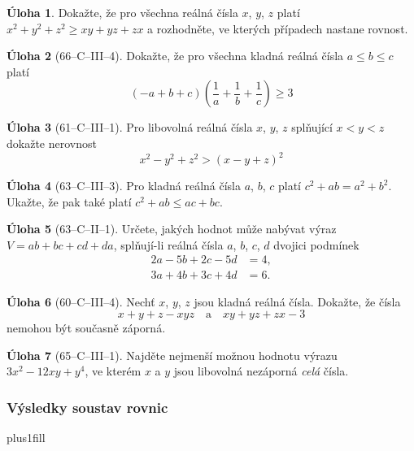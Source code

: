\documentclass[10pt,a5paper]{article}
\theoremstyle{definition}
\newtheorem{uloha}{\atr Úloha}
\def\vysld{}
\let\printvysl\relax
\def\atr{}
\let\results\newpage
\let\endresults\relax
\begin{document}
\begin{uloha}
Dokažte, že pro všechna reálná čísla $x$, $y$, $z$ platí $x^2 + y^2 + z^2 \geq xy + yz + zx$ a rozhodněte, ve kterých případech nastane rovnost.
\end{uloha}

\begin{uloha}[66--C--III--4]
Dokažte, že pro všechna kladná reálná čísla $a \leq b \leq c$ platí
\[ (-a+b+c)\left( \frac1a + \frac1b + \frac1c \right) \geq 3 \]
\end{uloha}

\begin{uloha}[61--C--III--1]
Pro libovolná reálná čísla $x$, $y$, $z$ splňující $x<y<z$ dokažte nerovnost
\[ x^2 - y^2 + z^2 > (x-y+z)^2 \]
\end{uloha}

\begin{uloha}[63--C--III--3]
Pro kladná reálná čísla $a$, $b$, $c$ platí $c^2 + ab = a^2 + b^2$. Ukažte, že pak také platí $c^2 + ab \leq ac + bc$.
\end{uloha}

\begin{uloha}[63--C--II--1]
Určete, jakých hodnot může nabývat výraz $V = ab + bc + cd + da$, splňují-li reálná čísla $a$, $b$, $c$, $d$ dvojici podmínek
\begin{align*}
2a - 5b + 2c - 5d &= 4,\\
3a + 4b + 3c + 4d &= 6.
\end{align*}
\end{uloha}

\begin{uloha}[60--C--III--4]
Nechť $x$, $y$, $z$ jsou kladná reálná čísla. Dokažte, že čísla \[x+y+z-xyz\quad \text{a}  \quad xy + yz + zx - 3\] nemohou být současně záporná.
\end{uloha}


\begin{uloha}[65--C--III--1]
Najděte nejmenší možnou hodnotu výrazu $3x^2 - 12xy + y^4$, ve kterém $x$ a $y$ jsou libovolná nezáporná \emph{celá} čísla.
\end{uloha}



\results
\footnotesize
\subsubsection*{Výsledky soustav rovnic}
\def\printvysl#1{\item #1}
\rightskip=0pt plus1fill\relax
\begin{enumerate*}
    \vysld
\end{enumerate*}
\endresults
\end{document}
